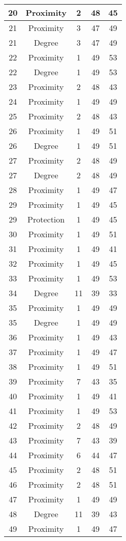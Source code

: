 \documentclass[results.tex]{subfiles}
\begin{document}
\begin{center}
\begin{tabular}{| c || c | c | c | c |}
    \hline
    20 & Proximity & 2 & 48 & 45 \\ 
    \hline
    21 & Proximity & 3 & 47 & 49 \\ 
    \hline
    21 & Degree & 3 & 47 & 49 \\ 
    \hline
    22 & Proximity & 1 & 49 & 53 \\ 
    \hline
    22 & Degree & 1 & 49 & 53 \\ 
    \hline
    23 & Proximity & 2 & 48 & 43 \\ 
    \hline
    24 & Proximity & 1 & 49 & 49 \\ 
    \hline
    25 & Proximity & 2 & 48 & 43 \\ 
    \hline
    26 & Proximity & 1 & 49 & 51 \\ 
    \hline
    26 & Degree & 1 & 49 & 51 \\ 
    \hline
    27 & Proximity & 2 & 48 & 49 \\ 
    \hline
    27 & Degree & 2 & 48 & 49 \\ 
    \hline
    28 & Proximity & 1 & 49 & 47 \\ 
    \hline
    29 & Proximity & 1 & 49 & 45 \\ 
    \hline
    29 & Protection & 1 & 49 & 45 \\ 
    \hline
    30 & Proximity & 1 & 49 & 51 \\ 
    \hline
    31 & Proximity & 1 & 49 & 41 \\ 
    \hline
    32 & Proximity & 1 & 49 & 45 \\ 
    \hline
    33 & Proximity & 1 & 49 & 53 \\ 
    \hline
    34 & Degree & 11 & 39 & 33 \\ 
    \hline
    35 & Proximity & 1 & 49 & 49 \\ 
    \hline
    35 & Degree & 1 & 49 & 49 \\ 
    \hline
    36 & Proximity & 1 & 49 & 43 \\ 
    \hline
    37 & Proximity & 1 & 49 & 47 \\ 
    \hline
    38 & Proximity & 1 & 49 & 51 \\ 
    \hline
    39 & Proximity & 7 & 43 & 35 \\ 
    \hline
    40 & Proximity & 1 & 49 & 41 \\ 
    \hline
    41 & Proximity & 1 & 49 & 53 \\ 
    \hline
    42 & Proximity & 2 & 48 & 49 \\ 
    \hline
    43 & Proximity & 7 & 43 & 39 \\ 
    \hline
    44 & Proximity & 6 & 44 & 47 \\ 
    \hline
    45 & Proximity & 2 & 48 & 51 \\ 
    \hline
    46 & Proximity & 2 & 48 & 51 \\ 
    \hline
    47 & Proximity & 1 & 49 & 49 \\ 
    \hline
    48 & Degree & 11 & 39 & 43 \\ 
    \hline
    49 & Proximity & 1 & 49 & 47 \\ 
    \hline   \end{tabular}
\end{center}
\end{document}
